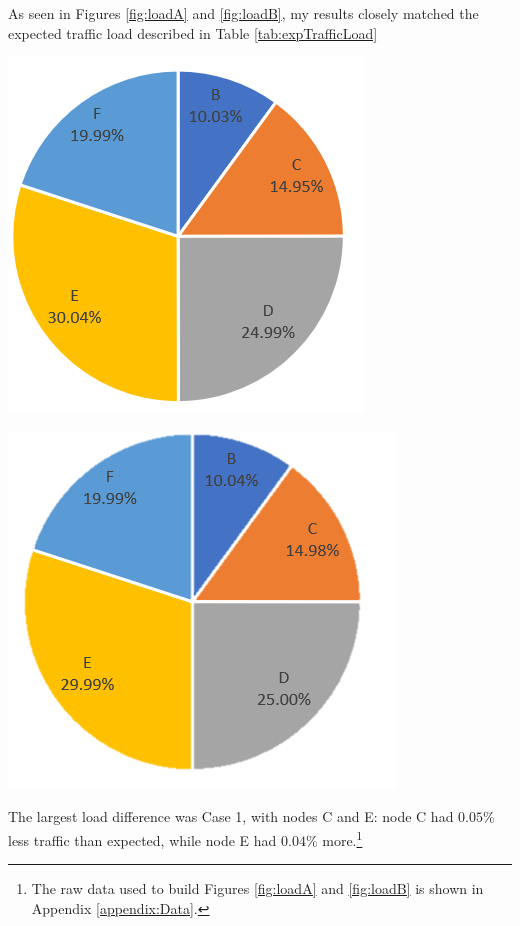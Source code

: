 \documentclass{article}
\begin{document}
As seen in Figures \ref{fig:loadA} and \ref{fig:loadB}, my results closely matched the expected traffic load described in Table \ref{tab:expTrafficLoad}

\begin{minipage}{0.5\textwidth}
\centering
\includegraphics[scale=0.7]{Images/LoadA.PNG}
\label{fig:loadA}
\end{minipage}
\begin{minipage}{0.5\textwidth}
\centering
\includegraphics[scale=0.7]{Images/LoadB.PNG}
\label{fig:loadB}
\end{minipage}
\newline

The largest load difference was Case 1, with nodes C and E:  node C had $0.05\%$ less traffic than expected, while node E had $0.04\%$ more.\footnote{The raw data used to build Figures \ref{fig:loadA} and \ref{fig:loadB} is shown in Appendix \ref{appendix:Data}.}
\end{document}
